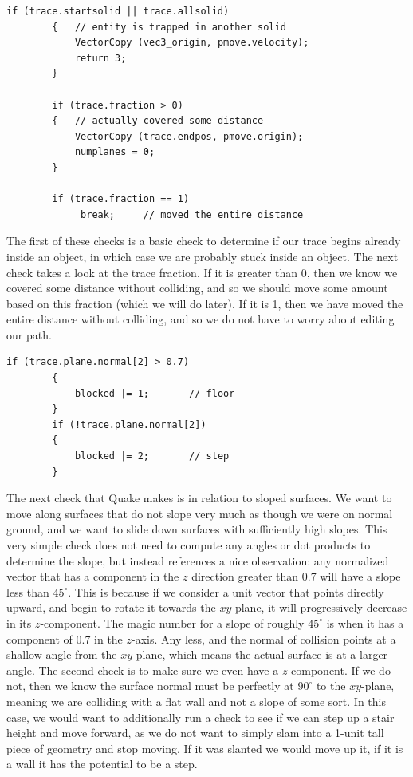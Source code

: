 \documentclass{article}
\begin{document}
\begin{verbatim}
if (trace.startsolid || trace.allsolid)
		{	// entity is trapped in another solid
			VectorCopy (vec3_origin, pmove.velocity);
			return 3;
		}

		if (trace.fraction > 0)
		{	// actually covered some distance
			VectorCopy (trace.endpos, pmove.origin);
			numplanes = 0;
		}
  
		if (trace.fraction == 1)
			 break;		// moved the entire distance
\end{verbatim}
The first of these checks is a basic check to determine if our trace begins already inside an object, in which case we are probably stuck inside an object. The next check takes a look at the trace fraction. If it is greater than 0, then we know we covered some distance without colliding, and so we should move some amount based on this fraction (which we will do later). If it is 1, then we have moved the entire distance without colliding, and so we do not have to worry about editing our path.
\begin{verbatim}
if (trace.plane.normal[2] > 0.7)
		{
			blocked |= 1;		// floor
		}
		if (!trace.plane.normal[2])
		{
			blocked |= 2;		// step
		}
\end{verbatim}
The next check that Quake makes is in relation to sloped surfaces. We want to move along surfaces that do not slope very much as though we were on normal ground, and we want to slide down surfaces with sufficiently high slopes.  This very simple check does not need to compute any angles or dot products to determine the slope, but instead references a nice observation: any normalized vector that has a component in the $z$ direction greater than 0.7 will have a slope less than $45^{\circ}$. This is because if we consider a unit vector that points directly upward, and begin to rotate it towards the $xy$-plane, it will progressively decrease in its $z$-component. The magic number for a slope of roughly $45^{\circ}$ is when it has a component of 0.7 in the $z$-axis. Any less, and the normal of collision points at a shallow angle from the $xy$-plane, which means the actual surface is at a larger angle. The second check is to make sure we even have a $z$-component. If we do not, then we know the surface normal must be perfectly at $90^{\circ}$ to the $xy$-plane, meaning we are colliding with a flat wall and not a slope of some sort. In this case, we would want to additionally run a check to see if we can step up a stair height and move forward, as we do not want to simply slam into a 1-unit tall piece of geometry and stop moving. If it was slanted we would move up it, if it is a wall it has the potential to be a step. 
\end{document}
